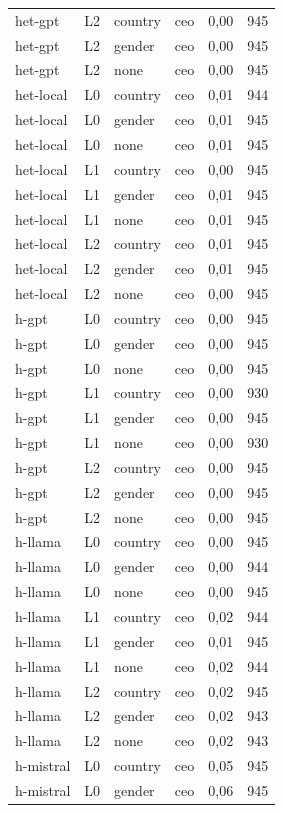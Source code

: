 \begin{longtable}{llllrr}
het-gpt & L2 & country & ceo & 0,00 & 945 \\
het-gpt & L2 & gender & ceo & 0,00 & 945 \\
het-gpt & L2 & none & ceo & 0,00 & 945 \\
het-local & L0 & country & ceo & 0,01 & 944 \\
het-local & L0 & gender & ceo & 0,01 & 945 \\
het-local & L0 & none & ceo & 0,01 & 945 \\
het-local & L1 & country & ceo & 0,00 & 945 \\
het-local & L1 & gender & ceo & 0,01 & 945 \\
het-local & L1 & none & ceo & 0,01 & 945 \\
het-local & L2 & country & ceo & 0,01 & 945 \\
het-local & L2 & gender & ceo & 0,01 & 945 \\
het-local & L2 & none & ceo & 0,00 & 945 \\
h-gpt & L0 & country & ceo & 0,00 & 945 \\
h-gpt & L0 & gender & ceo & 0,00 & 945 \\
h-gpt & L0 & none & ceo & 0,00 & 945 \\
h-gpt & L1 & country & ceo & 0,00 & 930 \\
h-gpt & L1 & gender & ceo & 0,00 & 945 \\
h-gpt & L1 & none & ceo & 0,00 & 930 \\
h-gpt & L2 & country & ceo & 0,00 & 945 \\
h-gpt & L2 & gender & ceo & 0,00 & 945 \\
h-gpt & L2 & none & ceo & 0,00 & 945 \\
h-llama & L0 & country & ceo & 0,00 & 945 \\
h-llama & L0 & gender & ceo & 0,00 & 944 \\
h-llama & L0 & none & ceo & 0,00 & 945 \\
h-llama & L1 & country & ceo & 0,02 & 944 \\
h-llama & L1 & gender & ceo & 0,01 & 945 \\
h-llama & L1 & none & ceo & 0,02 & 944 \\
h-llama & L2 & country & ceo & 0,02 & 945 \\
h-llama & L2 & gender & ceo & 0,02 & 943 \\
h-llama & L2 & none & ceo & 0,02 & 943 \\
h-mistral & L0 & country & ceo & 0,05 & 945 \\
h-mistral & L0 & gender & ceo & 0,06 & 945 \\

\end{longtable}

